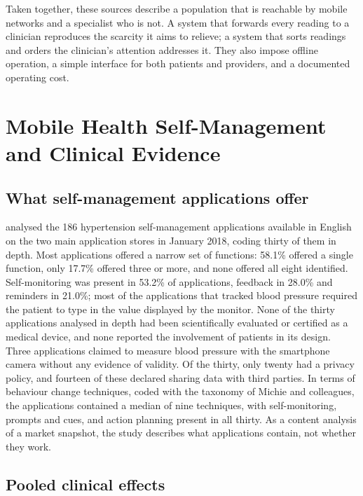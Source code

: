 \documentclass[12pt,a4paper,oneside]{report}
\begin{document}
Taken together, these sources describe a population that is reachable by mobile networks and a specialist who is not. A system that forwards every reading to a clinician reproduces the scarcity it aims to relieve; a system that sorts readings and orders the clinician's attention addresses it. They also impose offline operation, a simple interface for both patients and providers, and a documented operating cost.

\section{Mobile Health Self-Management and Clinical Evidence}\label{sec:outpatient}\label{sec:evidence}

\subsection{What self-management applications offer}\label{sec:apps}\label{sec:bct}

\Textcite{alessa2019} analysed the 186 hypertension self-management applications available in English on the two main application stores in January 2018, coding thirty of them in depth. Most applications offered a narrow set of functions: 58.1\% offered a single function, only 17.7\% offered three or more, and none offered all eight identified. Self-monitoring was present in 53.2\% of applications, feedback in 28.0\% and reminders in 21.0\%; most of the applications that tracked blood pressure required the patient to type in the value displayed by the monitor. None of the thirty applications analysed in depth had been scientifically evaluated or certified as a medical device, and none reported the involvement of patients in its design. Three applications claimed to measure blood pressure with the smartphone camera without any evidence of validity. Of the thirty, only twenty had a privacy policy, and fourteen of these declared sharing data with third parties. In terms of behaviour change techniques, coded with the taxonomy of Michie and colleagues, the applications contained a median of nine techniques, with self-monitoring, prompts and cues, and action planning present in all thirty. As a content analysis of a market snapshot, the study describes what applications contain, not whether they work.

\subsection{Pooled clinical effects}\label{sec:efficacy}\label{sec:oversight}\label{sec:evidence-deficit}
\end{document}
